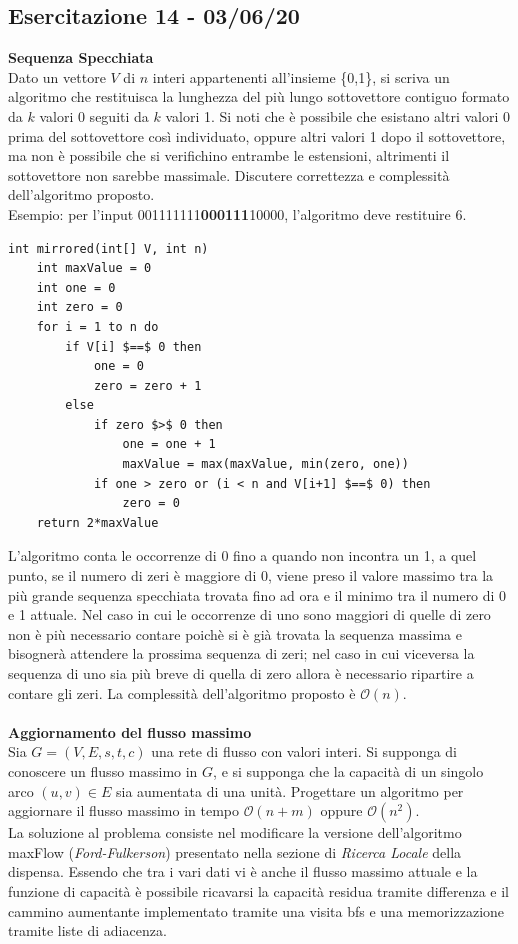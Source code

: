 \documentclass[../cheatSheetAlgoritmi.tex]{subfiles}
\begin{document}
\subsection{Esercitazione 14 - 03/06/20}
\textbf{Sequenza Specchiata}\\
Dato un vettore $V$ di $n$ interi appartenenti all’insieme \{0,1\}, si scriva un algoritmo che restituisca la lunghezza del più lungo sottovettore contiguo formato da $k$ valori 0 seguiti da $k$ valori 1. Si noti che è possibile che esistano altri valori 0 prima del sottovettore così individuato, oppure altri valori 1 dopo il sottovettore, ma non è possibile che si verifichino entrambe le estensioni, altrimenti il sottovettore non sarebbe massimale. Discutere correttezza e complessità dell'algoritmo proposto.\\
Esempio: per l’input 001111111\textbf{000111}10000, l’algoritmo deve restituire 6.\\
\begin{lstlisting}[caption=Sequenza Specchiata]
int mirrored(int[] V, int n)
	int maxValue = 0
	int one = 0
	int zero = 0
	for i = 1 to n do
		if V[i] $==$ 0 then
			one = 0
			zero = zero + 1
		else
			if zero $>$ 0 then
				one = one + 1
				maxValue = max(maxValue, min(zero, one))
			if one > zero or (i < n and V[i+1] $==$ 0) then
				zero = 0
	return 2*maxValue
\end{lstlisting}
L'algoritmo conta le occorrenze di 0 fino a quando non incontra un 1, a quel punto, se il numero di zeri è maggiore di 0, viene preso il valore massimo tra la più grande sequenza specchiata trovata fino ad ora e il minimo tra il numero di 0 e 1 attuale. Nel caso in cui le occorrenze di uno sono maggiori di quelle di zero non è più necessario contare poichè si è già trovata la sequenza massima e bisognerà attendere la prossima sequenza di zeri; nel caso in cui viceversa la sequenza di uno sia più breve di quella di zero allora è necessario ripartire a contare gli zeri. La complessità dell'algoritmo proposto è $\mathcal{O}(n)$.\\\\
\textbf{Aggiornamento del flusso massimo}\\
Sia $G= (V, E, s, t, c)$ una rete di flusso con valori interi. Si supponga di conoscere un flusso massimo in $G$, e si supponga che la capacità di un singolo arco $(u, v) \in E$ sia aumentata di una unità. Progettare un algoritmo per aggiornare il flusso massimo in tempo $\mathcal{O}(n+m)$ oppure $\mathcal{O}(n^{2})$.\\
La soluzione al problema consiste nel modificare la versione dell'algoritmo maxFlow (\emph{Ford-Fulkerson}) presentato nella sezione di \emph{Ricerca Locale} della dispensa. Essendo che tra i vari dati vi è anche il flusso massimo attuale e la funzione di capacità è possibile ricavarsi la capacità residua tramite differenza e il cammino aumentante implementato tramite una visita bfs e una memorizzazione tramite liste di adiacenza.
\end{document}
